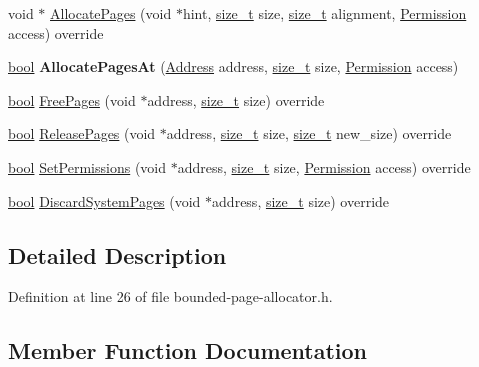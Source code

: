 \begin{DoxyCompactItemize}
void $\ast$ \mbox{\hyperlink{classv8_1_1base_1_1BoundedPageAllocator_a0de34af3c63e3a50ed6f8613720286b6}{Allocate\+Pages}} (void $\ast$hint, \mbox{\hyperlink{classsize__t}{size\+\_\+t}} size, \mbox{\hyperlink{classsize__t}{size\+\_\+t}} alignment, \mbox{\hyperlink{classv8_1_1PageAllocator_a88f74b164fe97e053259f67a95758415}{Permission}} access) override
\item 
\mbox{\label{classv8_1_1base_1_1BoundedPageAllocator_a282d7487ccd135307e166d5af65f65a6}} 
\mbox{\hyperlink{classbool}{bool}} {\bfseries Allocate\+Pages\+At} (\mbox{\hyperlink{classuintptr__t}{Address}} address, \mbox{\hyperlink{classsize__t}{size\+\_\+t}} size, \mbox{\hyperlink{classv8_1_1PageAllocator_a88f74b164fe97e053259f67a95758415}{Permission}} access)
\item 
\mbox{\hyperlink{classbool}{bool}} \mbox{\hyperlink{classv8_1_1base_1_1BoundedPageAllocator_a52bf55c7bd934bd67982d37691c15573}{Free\+Pages}} (void $\ast$address, \mbox{\hyperlink{classsize__t}{size\+\_\+t}} size) override
\item 
\mbox{\hyperlink{classbool}{bool}} \mbox{\hyperlink{classv8_1_1base_1_1BoundedPageAllocator_abf47c5cae52f79c77bfc6bdcbcced44a}{Release\+Pages}} (void $\ast$address, \mbox{\hyperlink{classsize__t}{size\+\_\+t}} size, \mbox{\hyperlink{classsize__t}{size\+\_\+t}} new\+\_\+size) override
\item 
\mbox{\hyperlink{classbool}{bool}} \mbox{\hyperlink{classv8_1_1base_1_1BoundedPageAllocator_ae5b6f900d5722eb27be5eb376b8228a3}{Set\+Permissions}} (void $\ast$address, \mbox{\hyperlink{classsize__t}{size\+\_\+t}} size, \mbox{\hyperlink{classv8_1_1PageAllocator_a88f74b164fe97e053259f67a95758415}{Permission}} access) override
\item 
\mbox{\hyperlink{classbool}{bool}} \mbox{\hyperlink{classv8_1_1base_1_1BoundedPageAllocator_a31ae3d1e2696d53c6ac47e2f525bc1e7}{Discard\+System\+Pages}} (void $\ast$address, \mbox{\hyperlink{classsize__t}{size\+\_\+t}} size) override
\end{DoxyCompactItemize}


\subsection{Detailed Description}


Definition at line 26 of file bounded-\/page-\/allocator.\+h.



\subsection{Member Function Documentation}
\mbox{\label{classv8_1_1base_1_1BoundedPageAllocator_a0de34af3c63e3a50ed6f8613720286b6}} 
